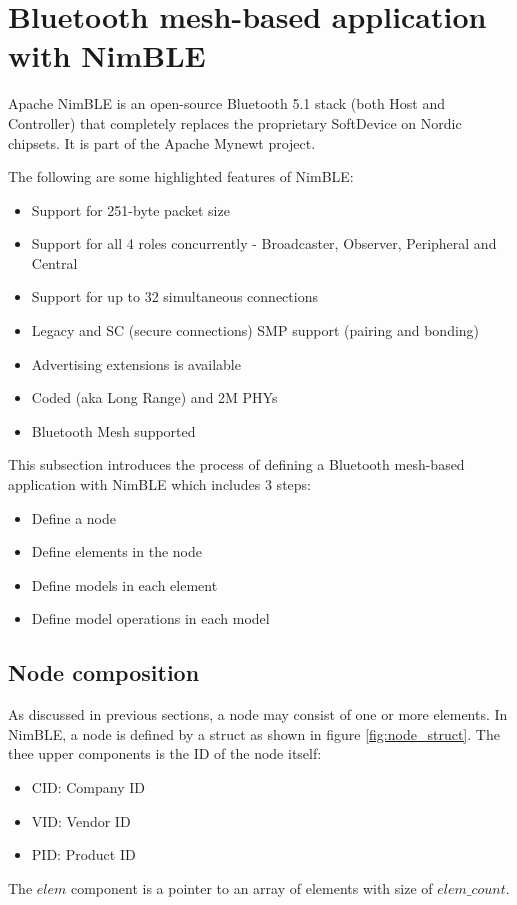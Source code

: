 \documentclass[\main/main.tex]{subfiles}
\begin{document}
\section{Bluetooth mesh-based application with NimBLE}
Apache NimBLE is an open-source Bluetooth 5.1 stack (both Host and Controller) that completely replaces the proprietary SoftDevice on Nordic chipsets. It is part of the Apache Mynewt project.

The following are some highlighted features of NimBLE:
\begin{itemize}
    \item Support for 251-byte packet size
    \item Support for all 4 roles concurrently - Broadcaster, Observer, Peripheral and Central
    \item Support for up to 32 simultaneous connections
    \item Legacy and SC (secure connections) SMP support (pairing and bonding)
    \item Advertising extensions is available
    \item Coded (aka Long Range) and 2M PHYs
    \item Bluetooth Mesh supported
\end{itemize}

This subsection introduces the process of defining a Bluetooth mesh-based application with NimBLE which includes 3 steps:
\begin{itemize}
    \item Define a node
    \item Define elements in the node
    \item Define models in each element
    \item Define model operations in each model
\end{itemize}
\subsection{Node composition}
As discussed in previous sections, a node may consist of one or more elements. In NimBLE, a node is defined by a struct as shown in figure \ref{fig:node_struct}. The thee upper components is the ID of the node itself:
\begin{itemize}
    \item CID: Company ID
    \item VID: Vendor ID
    \item PID: Product ID
\end{itemize}
The $elem$ component is a pointer to an array of elements with  size of $elem\_count$.
\end{document}
